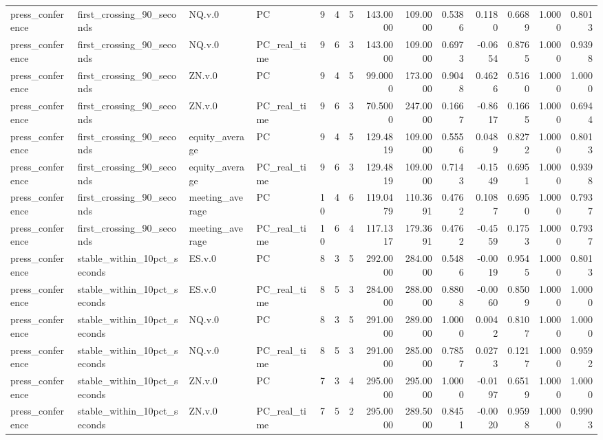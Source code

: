 \begin{tabular}{llllrrrrrrrrrr}
press_conference & first_crossing_90_seconds & NQ.v.0 & PC & 9 & 4 & 5 & 143.0000 & 109.0000 & 0.5386 & 0.1180 & 0.6689 & 1.0000 & 0.8013 \\
press_conference & first_crossing_90_seconds & NQ.v.0 & PC_real_time & 9 & 6 & 3 & 143.0000 & 109.0000 & 0.6973 & -0.0654 & 0.8765 & 1.0000 & 0.9398 \\
press_conference & first_crossing_90_seconds & ZN.v.0 & PC & 9 & 4 & 5 & 99.0000 & 173.0000 & 0.9048 & 0.4626 & 0.5160 & 1.0000 & 1.0000 \\
press_conference & first_crossing_90_seconds & ZN.v.0 & PC_real_time & 9 & 6 & 3 & 70.5000 & 247.0000 & 0.1667 & -0.8617 & 0.1665 & 1.0000 & 0.6944 \\
press_conference & first_crossing_90_seconds & equity_average & PC & 9 & 4 & 5 & 129.4819 & 109.0000 & 0.5556 & 0.0489 & 0.8272 & 1.0000 & 0.8013 \\
press_conference & first_crossing_90_seconds & equity_average & PC_real_time & 9 & 6 & 3 & 129.4819 & 109.0000 & 0.7143 & -0.1549 & 0.6951 & 1.0000 & 0.9398 \\
press_conference & first_crossing_90_seconds & meeting_average & PC & 10 & 4 & 6 & 119.0479 & 110.3691 & 0.4762 & 0.1087 & 0.6950 & 1.0000 & 0.7937 \\
press_conference & first_crossing_90_seconds & meeting_average & PC_real_time & 10 & 6 & 4 & 117.1317 & 179.3691 & 0.4762 & -0.4559 & 0.1753 & 1.0000 & 0.7937 \\
press_conference & stable_within_10pct_seconds & ES.v.0 & PC & 8 & 3 & 5 & 292.0000 & 284.0000 & 0.5486 & -0.0019 & 0.9545 & 1.0000 & 0.8013 \\
press_conference & stable_within_10pct_seconds & ES.v.0 & PC_real_time & 8 & 5 & 3 & 284.0000 & 288.0000 & 0.8808 & -0.0060 & 0.8509 & 1.0000 & 1.0000 \\
press_conference & stable_within_10pct_seconds & NQ.v.0 & PC & 8 & 3 & 5 & 291.0000 & 289.0000 & 1.0000 & 0.0042 & 0.8107 & 1.0000 & 1.0000 \\
press_conference & stable_within_10pct_seconds & NQ.v.0 & PC_real_time & 8 & 5 & 3 & 291.0000 & 285.0000 & 0.7857 & 0.0273 & 0.1217 & 1.0000 & 0.9592 \\
press_conference & stable_within_10pct_seconds & ZN.v.0 & PC & 7 & 3 & 4 & 295.0000 & 295.0000 & 1.0000 & -0.0197 & 0.6519 & 1.0000 & 1.0000 \\
press_conference & stable_within_10pct_seconds & ZN.v.0 & PC_real_time & 7 & 5 & 2 & 295.0000 & 289.5000 & 0.8451 & -0.0020 & 0.9598 & 1.0000 & 0.9903 \\

\end{tabular}
